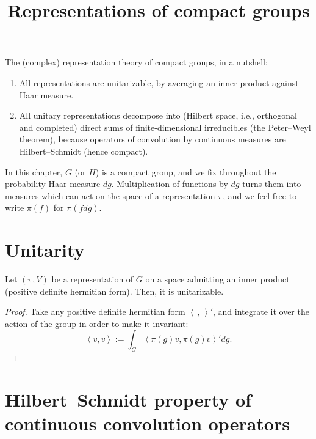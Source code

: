 

%


\title{Representations of compact groups}


\maketitle

\label{section-phantom}


\tableofcontents


The (complex) representation theory of compact groups, in a nutshell:
\begin{enumerate}
 \item All representations are unitarizable, by averaging an inner product against Haar measure.
 \item All unitary representations decompose into (Hilbert space, i.e., orthogonal and completed) direct sums of finite-dimensional irreducibles (the Peter--Weyl theorem), because operators of convolution by continuous measures are Hilbert--Schmidt (hence compact).
\end{enumerate}


In this chapter, $G$ (or $H$) is a compact group, and we fix throughout the probability Haar measure $dg$. Multiplication of functions by $dg$ turns them into measures which can act on the space of a representation $\pi$, and we feel free to write $\pi(f)$ for $\pi(f dg)$. 

\section{Unitarity}
\label{section-unitarity}

\begin{proposition}
\label{proposition-compact-unitarizable}
 Let $(\pi,V)$ be a representation of $G$ on a space admitting an inner product (positive definite hermitian form). Then, it is unitarizable.
\end{proposition}

\begin{proof}
 Take any positive definite hermitian form $\left< \, , \,\right>'$, and integrate it over the action of the group in order to make it invariant:
 $$ \left<  v, v\right>:= \int_G \left< \pi(g) v, \pi(g) v\right>' dg.$$
\end{proof}

\section{Hilbert--Schmidt property of continuous convolution operators}
\label{section-Hilbert-Schmidt}

